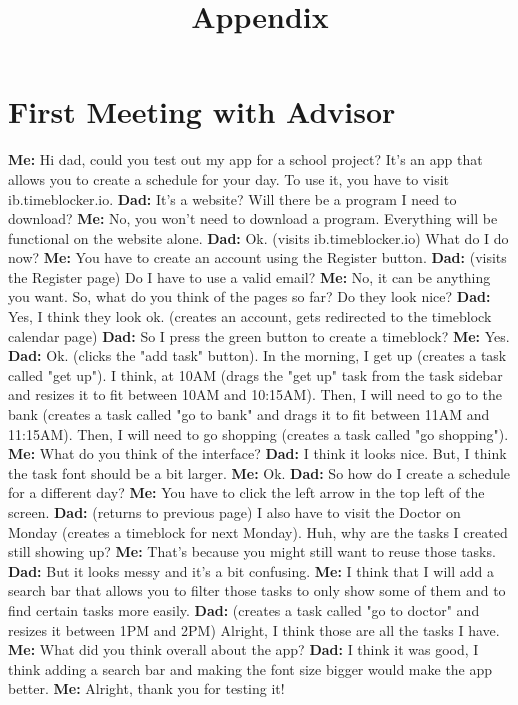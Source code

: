\documentclass[12pt]{report}
\title{Appendix}
\begin{document}
\centerline{\textcolor{msblue}{
		\textbf{\fontsize{13}{13}\MyTitle}
	}}


\bgroup\obeylines
\section*{First Meeting with Advisor}
\textbf{Me:} Hi dad, could you test out my app for a school project? It's an app that allows you to create a schedule for your day. To use it, you have to visit ib.timeblocker.io.
\textbf{Dad:} It's a website? Will there be a program I need to download?
\textbf{Me:} No, you won't need to download a program. Everything will be functional on the website alone.
\textbf{Dad:} Ok. (visits ib.timeblocker.io) What do I do now?
\textbf{Me:} You have to create an account using the Register button.
\textbf{Dad:} (visits the Register page) Do I have to use a valid email?
\textbf{Me:} No, it can be anything you want. So, what do you think of the pages so far? Do they look nice?
\textbf{Dad:} Yes, I think they look ok. (creates an account, gets redirected to the timeblock calendar page)
\textbf{Dad:} So I press the green button to create a timeblock?
\textbf{Me:} Yes.
\textbf{Dad:} Ok. (clicks the "add task" button). In the morning, I get up (creates a task called "get up"). I think, at 10AM (drags the "get up" task from the task sidebar and resizes it to fit between 10AM and 10:15AM). Then, I will need to go to the bank (creates a task called "go to bank" and drags it to fit between 11AM and 11:15AM). Then, I will need to go shopping (creates a task called "go shopping").
\textbf{Me:} What do you think of the interface?
\textbf{Dad:} I think it looks nice. But, I think the task font should be a bit larger.
\textbf{Me:} Ok.
\textbf{Dad:} So how do I create a schedule for a different day?
\textbf{Me:} You have to click the left arrow in the top left of the screen.
\textbf{Dad:} (returns to previous page) I also have to visit the Doctor on Monday (creates a timeblock for next Monday). Huh, why are the tasks I created still showing up?
\textbf{Me:} That's because you might still want to reuse those tasks.
\textbf{Dad:} But it looks messy and it's a bit confusing.
\textbf{Me:} I think that I will add a search bar that allows you to filter those tasks to only show some of them and to find certain tasks more easily.
\textbf{Dad:} (creates a task called "go to doctor" and resizes it between 1PM and 2PM) Alright, I think those are all the tasks I have.
\textbf{Me:} What did you think overall about the app?
\textbf{Dad:} I think it was good, I think adding a search bar and making the font size bigger would make the app better.
\textbf{Me:} Alright, thank you for testing it!
\end{document}
